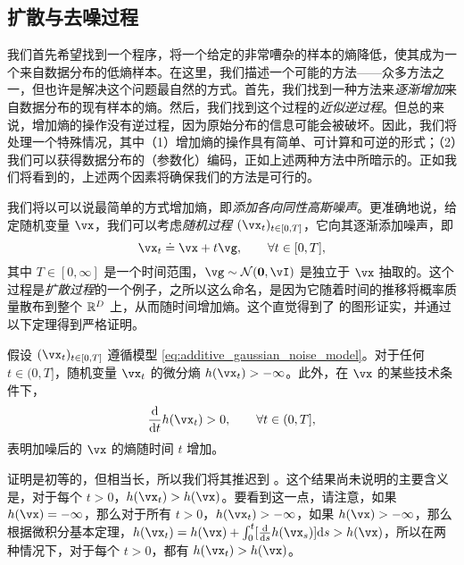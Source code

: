 \documentclass[../../book-main_zh.tex]{subfiles}
\begin{document}
\subsection{扩散与去噪过程} \label{sub:intro_diffusion_denoising}

我们首先希望找到一个程序，将一个给定的非常嘈杂的样本的熵降低，使其成为一个来自数据分布的低熵样本。在这里，我们描述一个可能的方法——众多方法之一，但也许是解决这个问题最自然的方式。首先，我们找到一种方法来\textit{逐渐增加}来自数据分布的现有样本的熵。然后，我们找到这个过程的\textit{近似逆过程}。但总的来说，增加熵的操作没有逆过程，因为原始分布的信息可能会被破坏。因此，我们将处理一个特殊情况，其中（1）增加熵的操作具有简单、可计算和可逆的形式；（2）我们可以获得数据分布的（参数化）编码，正如上述两种方法中所暗示的。正如我们将看到的，上述两个因素将确保我们的方法是可行的。

我们将以可以说最简单的方式增加熵，即\textit{添加各向同性高斯噪声}。更准确地说，给定随机变量 \(\vx\)，我们可以考虑\textit{随机过程} \((\vx_{t})_{t \in [0, T]}\)，它向其逐渐添加噪声，即
\begin{equation}\label{eq:additive_gaussian_noise_model}
	\vx_{t} \doteq \vx + t\vg, \qquad \forall t \in [0, T],
\end{equation}
其中 \(T \in [0, \infty]\) 是一个时间范围，\(\vg \sim \dNorm(\vzero, \vI)\) 是独立于 \(\vx\) 抽取的。这个过程是\textit{扩散过程}的一个例子，之所以这么命名，是因为它随着时间的推移将概率质量散布到整个 \(\mathbb{R}^{D}\) 上，从而随时间增加熵。这个直觉得到了  的图形证实，并通过以下定理得到严格证明。
\begin{theorem}
	假设 \((\vx_{t})_{t \in [0, T]}\) 遵循模型 \eqref{eq:additive_gaussian_noise_model}。对于任何 \(t \in (0, T]\)，随机变量 \(\vx_{t}\) 的微分熵 \(h(\vx_{t}) > -\infty\)。此外，在 \(\vx\) 的某些技术条件下，
	\begin{equation}
		\odv*{h(\vx_{t})}{t} > 0, \qquad \forall t \in (0, T],
	\end{equation}
	表明加噪后的 \(\vx\) 的熵随时间 \(t\) 增加。
\end{theorem}
证明是初等的，但相当长，所以我们将其推迟到 。这个结果尚未说明的主要含义是，对于每个 \(t > 0\)，\(h(\vx_{t}) > h(\vx)\)。要看到这一点，请注意，如果 \(h(\vx) = -\infty\)，那么对于所有 \(t > 0\)，\(h(\vx_{t}) > -\infty\)，如果 \(h(\vx) > -\infty\)，那么根据微积分基本定理，\(h(\vx_{t}) = h(\vx) + \int_{0}^{t}[\odv*{h(\vx_{s})}{s}]\odif{s} > h(\vx)\)，所以在两种情况下，对于每个 \(t > 0\)，都有 \(h(\vx_{t}) > h(\vx)\)。
\end{document}
